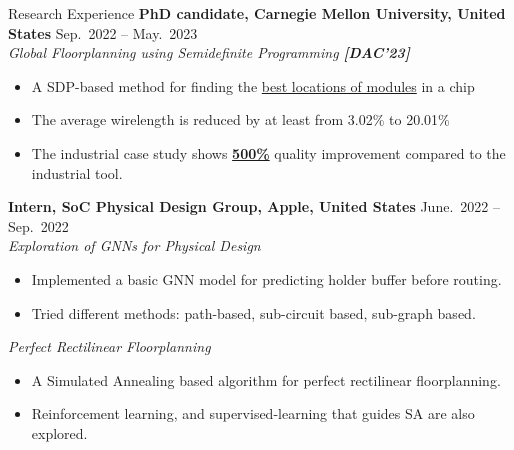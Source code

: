 \begin{rSection}{Research Experience}
    {\bf PhD candidate, Carnegie Mellon University, United States}               \hfill { Sep.~2022 -- May.~2023} \\
    \textit{Global Floorplanning using Semidefinite Programming \textbf{[{{DAC'23}}]}} 
    \begin{itemize}[noitemsep,topsep=-5pt]
        \item A SDP-based method for finding the \underline{best locations of modules} in a chip
        \item The average wirelength is reduced by at least from 3.02\% to 20.01\%
        \item The industrial case study shows \underline{\textbf{500\%}} quality improvement compared to the industrial tool.\\
    \end{itemize} 

{\bf Intern, SoC Physical Design Group, Apple, United States}               \hfill { June.~2022 -- Sep.~2022} \\
\textit{Exploration of GNNs for Physical Design }
\begin{itemize}[noitemsep,topsep=-5pt]
    \item Implemented a basic GNN model for predicting holder buffer before routing.
    \item Tried different methods: path-based, sub-circuit based, sub-graph based.
\end{itemize}
\textit{Perfect Rectilinear Floorplanning}
\begin{itemize}[noitemsep,topsep=-5pt]
    \item A Simulated Annealing based algorithm for perfect rectilinear floorplanning.
    \item Reinforcement learning, and supervised-learning that guides SA are also explored.\\
\end{itemize}


\end{rSection}

